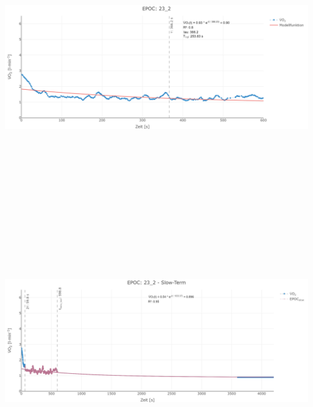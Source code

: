 \documentclass[
  letterpaper,
  DIV=11]{scrartcl}
\begin{document}
\includegraphics[width=11.45833in,height=4.6875in]{images/23_2_tau.png}
\includegraphics[width=11.45833in,height=4.6875in]{images/23_2_slow.png}
\end{document}

